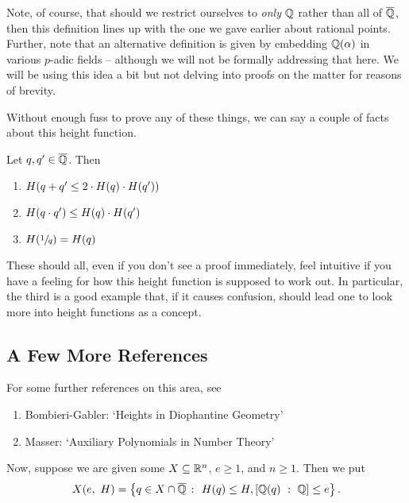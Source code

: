 \begin{remark}
  Note, of course, that should we restrict ourselves to \emph{only} $\Q$ rather than all of $\Qbar$, then this definition lines up with the one we gave earlier about rational points. Further, note that an alternative definition is given by embedding $\Q(\alpha)$ in various $p$-adic fields -- although we will not be formally addressing that here. We will be using this idea a bit but not delving into proofs on the matter for reasons of brevity.
\end{remark}

Without enough fuss to prove any of these things, we can say a couple of facts about this height function.

\begin{proposition}
  Let $q, \pri{q} \in \Qbar$. Then
    \begin{enumerate}
      \item $H(q + \pri{q} \leq 2 \cdot H(q) \cdot H(\pri{q}))$
      \item $H(q \cdot \pri{q}) \leq H(q) \cdot H(\pri{q})$
      \item $H(\sfrac{1}{q}) = H(q)$
    \end{enumerate}
    These should all, even if you don't see a proof immediately, feel intuitive if you have a feeling for how this height function is supposed to work out. In particular, the third is a good example that, if it causes confusion, should lead one to look more into height functions as a concept.
\end{proposition}

\subsection{A Few More References}

For some further references on this area, see
\begin{enumerate}
  \item Bombieri-Gabler: `Heights in Diophantine Geometry'
  \item Masser: `Auxiliary Polynomials in Number Theory'
\end{enumerate}


Now, suppose we are given some $\XRn[X]{n}$, $e \geq 1$, and $n \geq 1$. Then we put
  \begin{align*}
    \XeH{e} = \left\{ q \in X \cap \Qbar \ \colon \ H(q) \leq H, [\Q(q) \ : \ \Q] \leq e \right\}.
  \end{align*}

